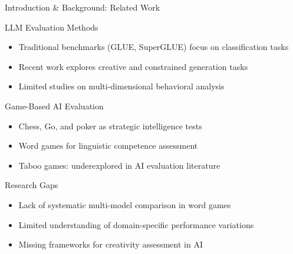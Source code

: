 \documentclass[aspectratio=169]{beamer}
\begin{document}
\begin{frame}{Introduction \& Background: Related Work}
\begin{block}{LLM Evaluation Methods}
\begin{itemize}
    \item Traditional benchmarks (GLUE, SuperGLUE) focus on classification tasks
    \item Recent work explores creative and constrained generation tasks
    \item Limited studies on multi-dimensional behavioral analysis
\end{itemize}
\end{block}

\begin{block}{Game-Based AI Evaluation}
\begin{itemize}
    \item Chess, Go, and poker as strategic intelligence tests
    \item Word games for linguistic competence assessment
    \item Taboo games: underexplored in AI evaluation literature
\end{itemize}
\end{block}

\begin{block}{Research Gaps}
\begin{itemize}
    \item Lack of systematic multi-model comparison in word games
    \item Limited understanding of domain-specific performance variations
    \item Missing frameworks for creativity assessment in AI
\end{itemize}
\end{block}
\end{frame}
\end{document}

